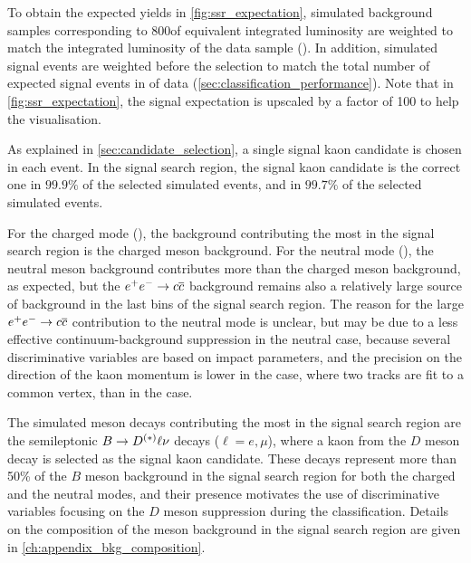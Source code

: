 To obtain the expected yields in \cref{fig:ssr_expectation}, simulated background samples corresponding to 800\invfb of equivalent integrated luminosity are weighted to match the integrated luminosity of the data sample (\lumion).
In addition, \nsignalmctest simulated signal events are weighted before the selection to match the total number of expected signal events in \lumion of data (\cref{sec:classification_performance}).
Note that in \cref{fig:ssr_expectation}, the signal expectation is upscaled by a factor of 100 to help the visualisation.

As explained in \cref{sec:candidate_selection}, a single signal kaon candidate is chosen in each event.
In the signal search region, the signal kaon candidate is the correct one in $99.9\%$ of the selected simulated \BKpnn events, and in $99.7\%$ of the selected simulated \BKznn events.

For the charged mode (\BKpnn), the background contributing the most in the signal search region is the charged \B meson background.
For the neutral mode (\BKznn), the neutral \B meson background contributes more than the charged \B meson background, as expected, but the $e^+e^-\rightarrow c\overline c$ background remains also a relatively large source of background in the last bins of the signal search region.
The reason for the large $e^+e^-\rightarrow c\overline c$ contribution to the neutral mode is unclear, but may be due to a less effective continuum-background suppression in the neutral case, because several discriminative variables are based on impact parameters, and the precision on the direction of the kaon momentum is lower in the \KS case, where two tracks are fit to a common vertex, than in the \Kp case.

The simulated \B meson decays contributing the most in the signal search region are the semileptonic $B\rightarrow D^{(*)}\ell\nu$ decays ($\ell=e,\mu$), where a kaon from the $D$ meson decay is selected as the signal kaon candidate.
These decays represent more than 50\% of the $B$ meson background in the signal search region for both the charged and the neutral modes, and their presence motivates the use of discriminative variables focusing on the $D$ meson suppression during the classification.
Details on the composition of the \B meson background in the signal search region are given in \cref{ch:appendix_bkg_composition}.

